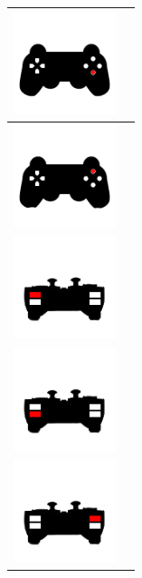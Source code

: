 \begin{table}[H]
  \begin{center}
    \begin{tabular}{|p{3cm}|p{8cm}|}
      \hline
       \includegraphics[width=3cm]{../imagenes/pad-7.png} & \vspace*{-.8in}{Incrementar velocidad. La velocidad de movimiento del vehículo aumenta.} \\
      \hline
       \includegraphics[width=3cm]{../imagenes/pad-5.png} & \vspace*{-.8in}{Sin función.} \\
      \hline
      \includegraphics[width=3cm]{../imagenes/pad-9.png} & \vspace*{-.8in}{Tomar fotografía. Realiza una captura de la imagen visualizada en pantalla.} \\
      \hline
      \includegraphics[width=3cm]{../imagenes/pad-10.png} & \vspace*{-.8in}{Sin función.} \\
      \hline
      \includegraphics[width=3cm]{../imagenes/pad-11.png} & \vspace*{-.8in}{Activación/desactivación de láseres. Los láseres son desactivados si se encuentran en estado encendido o activados si se encuentran en estado apagado.} \\

\end{tabular}
\end{center}
\end{table}
